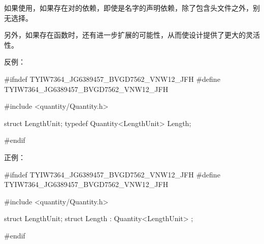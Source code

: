 \begin{content}
如果使用，如果存在对的依赖，即使是名字的声明依赖，除了包含头文件之外，别无选择。

另外，如果存在函数时，还有进一步扩展的可能性，从而使设计提供了更大的灵活性。

反例：
\begin{leftbar}
\begin{c++}[caption={\ttfamily{quantity/Length.h}}]
#ifndef TYIW7364_JG6389457_BVGD7562_VNW12_JFH
#define TYIW7364_JG6389457_BVGD7562_VNW12_JFH

#include <quantity/Quantity.h>

struct LengthUnit;
typedef Quantity<LengthUnit> Length;

#endif
\end{c++}
\end{leftbar}

正例：
\begin{leftbar}
\begin{c++}[caption={\ttfamily{quantity/Length.h}}]
#ifndef TYIW7364_JG6389457_BVGD7562_VNW12_JFH
#define TYIW7364_JG6389457_BVGD7562_VNW12_JFH

#include <quantity/Quantity.h>

struct LengthUnit;
struct Length : Quantity<LengthUnit> {};

#endif
\end{c++}
\end{leftbar}

\end{content}
